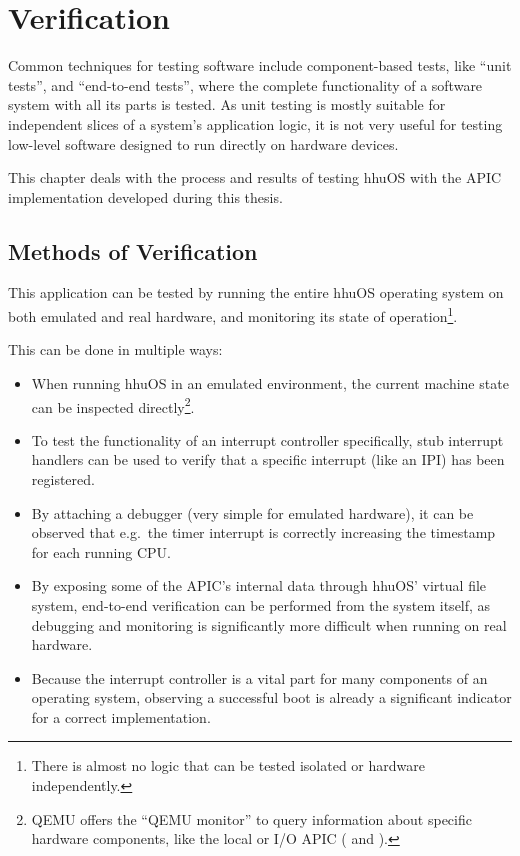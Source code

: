 \chapter{Verification}
\label{ch:verification}

Common techniques for testing software include component-based tests, like ``unit tests'', and
``end-to-end tests'', where the complete functionality of a software system with all its parts is
tested. As unit testing is mostly suitable for independent slices of a system's application logic,
it is not very useful for testing low-level software designed to run directly on hardware devices.

This chapter deals with the process and results of testing hhuOS with the APIC implementation
developed during this thesis.

\clearpage

\section{Methods of Verification}
\label{sec:verificationmethods}

This application can be tested by running the entire hhuOS operating system on both emulated and
real hardware, and monitoring its state of operation\footnote{There is almost no logic that can be
  tested isolated or hardware independently.}.

This can be done in multiple ways:

\begin{itemize}
  \item When running hhuOS in an emulated environment, the current machine state can be inspected
        directly\footnote{QEMU offers the ``QEMU monitor'' to query information about specific hardware
          components, like the local or I/O APIC ( and ).}.
  \item To test the functionality of an interrupt controller specifically, stub interrupt handlers can be
        used to verify that a specific interrupt (like an IPI) has been registered.
  \item By attaching a debugger (very simple for emulated hardware), it can be observed that e.g.\ the
        timer interrupt is correctly increasing the timestamp for each running CPU\@.
  \item By exposing some of the APIC's internal data through hhuOS' virtual file system, end-to-end
        verification can be performed from the system itself, as debugging and monitoring is significantly
        more difficult when running on real hardware.
  \item Because the interrupt controller is a vital part for many components of an operating system,
        observing a successful boot is already a significant indicator for a correct implementation.
\end{itemize}

